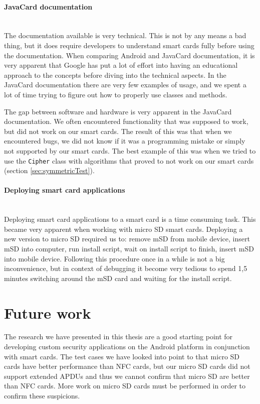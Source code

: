 \paragraph{JavaCard documentation}\mbox{}\\
The documentation available is very technical. This is not by any means a bad thing, but it does require developers to understand smart cards fully before using the documentation. When comparing Android and JavaCard documentation, it is very apparent that Google has put a lot of effort into having an educational approach to the concepts before diving into the technical aspects. In the JavaCard documentation there are very few examples of usage, and we spent a lot of time trying to figure out how to properly use classes and methods.

The gap between software and hardware is very apparent in the JavaCard documentation. We often encountered functionality that was supposed to work, but did not work on our smart cards. The result of this was that when we encountered bugs, we did not know if it was a programming mistake or simply not supported by our smart cards. The best example of this was when we tried to use the \texttt{Cipher} class with algorithms that proved to not work on our smart cards (section \ref{sec:symmetricTest}).

\paragraph{Deploying smart card applications}\mbox{}\\
Deploying smart card applications to a smart card is a time consuming task. This became very apparent when working with micro SD smart cards. Deploying a new version to micro SD required us to: remove mSD from mobile device, insert mSD into computer, run install script, wait on install script to finish, insert mSD into mobile device. Following this procedure once in a while is not a big inconvenience, but in context of debugging it become very tedious to spend 1,5 minutes switching around the mSD card and waiting for the install script.

\section{Future work}
\label{sec:future}
The research we have presented in this thesis are a good starting point for developing custom security applications on the Android platform in conjunction with smart cards. The test cases we have looked into point to that micro SD cards have better performance than NFC cards, but our micro SD cards did not support extended APDUs and thus we cannot confirm that micro SD are better than NFC cards. More work on micro SD cards must be performed in order to confirm these suspicions.

